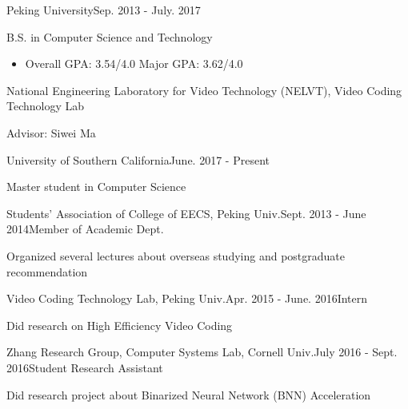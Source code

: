 \documentclass{joel_cv}
\begin{document}
\pagestyle{empty}

\begin{cvHeader} 
\end{cvHeader}

%
%

\begin{sectionContentSimple}{Peking University}{Sep. 2013 - July. 2017}
	\item B.S. in Computer Science and Technology
	\begin{itemize}
		\item Overall GPA: 3.54/4.0 \quad Major GPA: 3.62/4.0
	\end{itemize}
	\item National Engineering Laboratory for Video Technology (NELVT), Video Coding Technology Lab
	\item Advisor: Siwei Ma
\end{sectionContentSimple}

\begin{sectionContentSimple}{University of Southern California}{June. 2017 - Present}
	\item Master student in Computer Science
\end{sectionContentSimple}


%
%


\begin{sectionContentNormal}{Students' Association of College of EECS, Peking Univ.}{Sept. 2013 - June 2014}{Member of Academic Dept.}
	\item Organized several lectures about overseas studying and postgraduate recommendation
\end{sectionContentNormal}

\begin{sectionContentNormal}{Video Coding Technology Lab, Peking Univ.}{Apr. 2015 - June. 2016}{Intern}
	\item Did research on High Efficiency Video Coding
\end{sectionContentNormal}

\begin{sectionContentNormal}{Zhang Research Group, Computer Systems Lab, Cornell Univ.}{July 2016 - Sept. 2016}{Student Research Assistant}
	\item Did research project about Binarized Neural Network (BNN) Acceleration
\end{sectionContentNormal}
\end{document}
